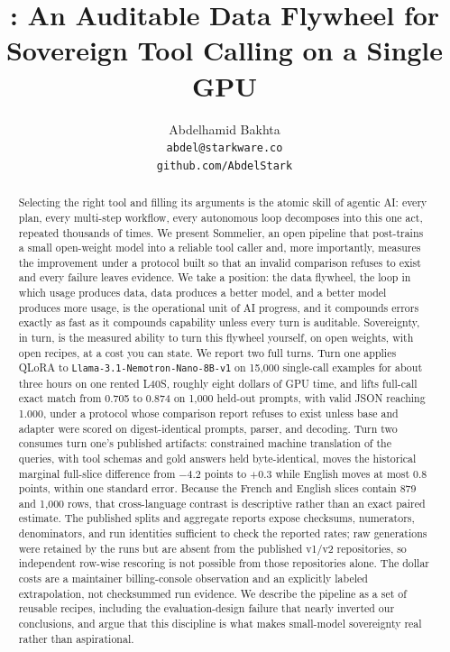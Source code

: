 \documentclass{article}
\title{\sommelier: An Auditable Data Flywheel for\\Sovereign Tool Calling on a Single GPU}
\author{%
  Abdelhamid Bakhta\\
  \texttt{abdel@starkware.co}\\
  \texttt{github.com/AbdelStark}\\
}
\newcommand{\sommelier}{Sommelier}
\newcommand{\basemodel}{\texttt{Llama-3.1-Nemotron-Nano-8B-v1}}
\begin{document}
\maketitle

\begin{abstract}
Selecting the right tool and filling its arguments is the atomic skill of agentic AI: every plan, every multi-step workflow, every autonomous loop decomposes into this one act, repeated thousands of times. We present \sommelier, an open pipeline that post-trains a small open-weight model into a reliable tool caller and, more importantly, measures the improvement under a protocol built so that an invalid comparison refuses to exist and every failure leaves evidence. We take a position: the data flywheel, the loop in which usage produces data, data produces a better model, and a better model produces more usage, is the operational unit of AI progress, and it compounds errors exactly as fast as it compounds capability unless every turn is auditable. Sovereignty, in turn, is the measured ability to turn this flywheel yourself, on open weights, with open recipes, at a cost you can state. We report two full turns. Turn one applies QLoRA to \basemodel{} on 15{,}000 single-call examples for about three hours on one rented L40S, roughly eight dollars of GPU time, and lifts full-call exact match from 0.705 to 0.874 on 1{,}000 held-out prompts, with valid JSON reaching 1.000, under a protocol whose comparison report refuses to exist unless base and adapter were scored on digest-identical prompts, parser, and decoding. Turn two consumes turn one's published artifacts: constrained machine translation of the queries, with tool schemas and gold answers held byte-identical, moves the historical marginal full-slice difference from $-4.2$ points to $+0.3$ while English moves at most 0.8 points, within one standard error. Because the French and English slices contain 879 and 1{,}000 rows, that cross-language contrast is descriptive rather than an exact paired estimate. The published splits and aggregate reports expose checksums, numerators, denominators, and run identities sufficient to check the reported rates; raw generations were retained by the runs but are absent from the published v1/v2 repositories, so independent row-wise rescoring is not possible from those repositories alone. The dollar costs are a maintainer billing-console observation and an explicitly labeled extrapolation, not checksummed run evidence. We describe the pipeline as a set of reusable recipes, including the evaluation-design failure that nearly inverted our conclusions, and argue that this discipline is what makes small-model sovereignty real rather than aspirational.
\end{abstract}
\end{document}
